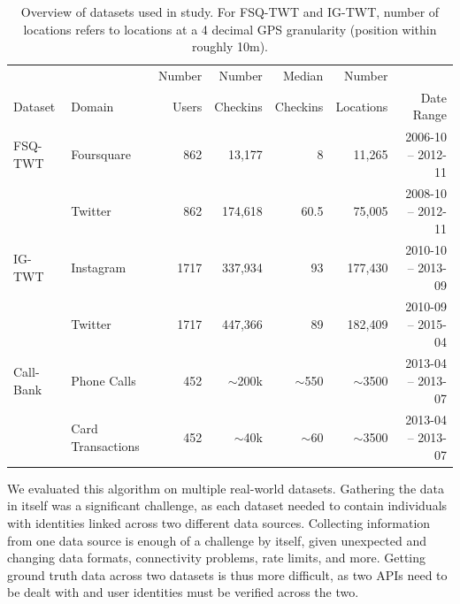 \begin{table}
  \centering
  \begin{tabular}{llrrrrr}
            &        & Number & Number  &   Median  &  Number   &           \\
    Dataset & Domain & Users & Checkins &  Checkins & Locations & Date Range\\
    \midrule
    FSQ-TWT   & Foursquare  & 862 & 13,177  & 8    & 11,265 & 2006-10 -- 2012-11 \\
              & Twitter     & 862 & 174,618 & 60.5 & 75,005 & 2008-10 -- 2012-11 \\
    \addlinespace
    IG-TWT    & Instagram   & 1717 & 337,934 & 93 & 177,430 & 2010-10 -- 2013-09 \\
              & Twitter     & 1717 & 447,366 & 89 & 182,409 & 2010-09 -- 2015-04 \\
    \addlinespace
    Call-Bank & Phone Calls       & 452 & $\sim$200k & $\sim$550 & $\sim$3500 & 2013-04 -- 2013-07 \\
              & Card Transactions & 452 & $\sim$40k & $\sim$60 & $\sim$3500 & 2013-04 -- 2013-07 \\
  \end{tabular}
  \caption{Overview of datasets used in study. For FSQ-TWT and IG-TWT, number of locations refers to locations at a 4 decimal GPS granularity (position within roughly 10m).}
  \label{tab:link-data}
\end{table}

We evaluated this algorithm on multiple real-world datasets.
Gathering the data in itself was a significant challenge, as each dataset needed to contain individuals with identities linked across two different data sources.
Collecting information from one data source is enough of a challenge by itself, given unexpected and changing data formats, connectivity problems, rate limits, and more.
Getting ground truth data across two datasets is thus more difficult, as two APIs need to be dealt with and user identities must be verified across the two.

